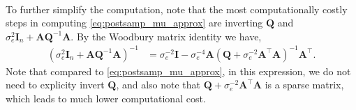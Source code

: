 \documentclass{article}
\begin{document}
{\begin{equation}
\begin{aligned}
\end{aligned}
\end{equation}
To further simplify the computation, note that the most computationally costly steps in computing \eqref{eq:postsamp_mu_approx} are inverting $\mathbf{Q}$ and $\sigma_e^2 \mathbf{I}_n + \mathbf{AQ}^{-1}\mathbf{A}$. By the Woodbury matrix identity we have,
\begin{align}
\label{eq:woodbury}
	\left(\sigma_e^2 \mathbf{I}_n + \mathbf{AQ}^{-1}\mathbf{A}\right)^{-1} &= \sigma_e^{-2}\mathbf{I} - \sigma_e^{-4}\mathbf{A}(\mathbf{Q} + \sigma_e^{-2}\mathbf{A}^\intercal\mathbf{A})^{-1} \mathbf{A}^\intercal.
\end{align}
Note that compared to \eqref{eq:postsamp_mu_approx}, in this expression, we do not need to explicity invert $\mathbf{Q}$, and also note that $\mathbf{Q} + \sigma_e^{-2}\mathbf{A}^\intercal\mathbf{A}$ is a sparse matrix, which leads to much lower computational cost.
}
\end{document}
